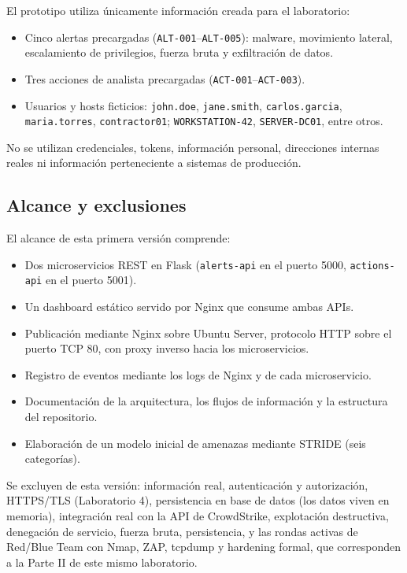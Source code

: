 \documentclass[journal]{IEEEtran}
\begin{document}
El prototipo utiliza únicamente información creada para el laboratorio:

\begin{itemize}
    \item Cinco alertas precargadas (\texttt{ALT-001}--\texttt{ALT-005}):
    malware, movimiento lateral, escalamiento de privilegios, fuerza bruta y
    exfiltración de datos.
    \item Tres acciones de analista precargadas (\texttt{ACT-001}--\texttt{ACT-003}).
    \item Usuarios y hosts ficticios: \texttt{john.doe}, \texttt{jane.smith},
    \texttt{carlos.garcia}, \texttt{maria.torres}, \texttt{contractor01};
    \texttt{WORKSTATION-42}, \texttt{SERVER-DC01}, entre otros.
\end{itemize}

No se utilizan credenciales, tokens, información personal, direcciones
internas reales ni información perteneciente a sistemas de producción.

\subsection{Alcance y exclusiones}

El alcance de esta primera versión comprende:

\begin{itemize}
    \item Dos microservicios REST en Flask (\texttt{alerts-api} en el puerto
    5000, \texttt{actions-api} en el puerto 5001).
    \item Un dashboard estático servido por Nginx que consume ambas APIs.
    \item Publicación mediante Nginx sobre Ubuntu Server, protocolo HTTP sobre
    el puerto TCP 80, con proxy inverso hacia los microservicios.
    \item Registro de eventos mediante los logs de Nginx y de cada
    microservicio.
    \item Documentación de la arquitectura, los flujos de información y la
    estructura del repositorio.
    \item Elaboración de un modelo inicial de amenazas mediante STRIDE (seis
    categorías).
\end{itemize}

Se excluyen de esta versión: información real, autenticación y autorización,
HTTPS/TLS (Laboratorio 4), persistencia en base de datos (los datos viven en
memoria), integración real con la API de CrowdStrike, explotación destructiva,
denegación de servicio, fuerza bruta, persistencia, y las rondas activas de
Red/Blue Team con Nmap, ZAP, tcpdump y hardening formal, que corresponden a la
Parte II de este mismo laboratorio.
\end{document}
